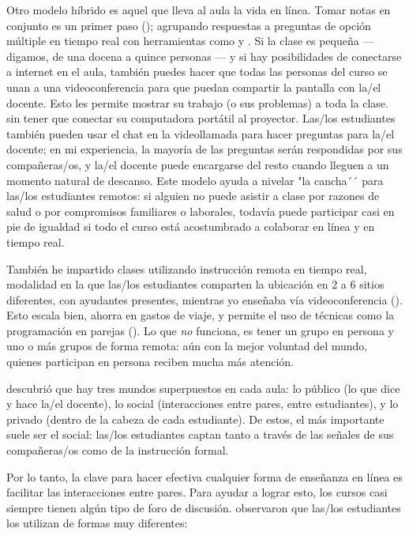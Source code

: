 Otro modelo híbrido es aquel que lleva al aula la vida en línea.
Tomar notas en conjunto es un primer paso ();
agrupando respuestas a preguntas de opción múltiple en tiempo real
con herramientas como 
y .
Si la clase es pequeña --- digamos, de una docena a quince personas ---
y si hay posibilidades de conectarse a internet en el aula,
también puedes
hacer que todas las personas del curso se unan a una videoconferencia
para que puedan compartir la pantalla con la/el docente.
Esto les permite mostrar su trabajo (o sus problemas) a toda la clase.
sin tener que conectar su computadora portátil al proyector.
Las/los estudiantes también pueden usar el chat en la videollamada para hacer preguntas para la/el docente;
en mi experiencia,
la mayoría de las preguntas serán respondidas por sus compañeras/os,
y la/el docente puede encargarse del resto cuando lleguen a un momento natural de descanso.
Este modelo ayuda a nivelar "la cancha´´ para las/los estudiantes remotos:
si alguien no puede asistir a clase por razones de salud
o por compromisos familiares o laborales,
todavía puede participar casi en pie de igualdad
si todo el curso está acostumbrado a colaborar en línea y en tiempo real.

También he impartido clases utilizando instrucción remota en tiempo real,
modalidad en la que las/los estudiantes comparten la ubicación en 2 a 6 sitios diferentes, con ayudantes presentes,
mientras yo enseñaba vía videoconferencia ().
Esto escala bien,
ahorra en gastos de viaje,
y permite el uso de técnicas como la programación en parejas ().
Lo que \emph{no} funciona, es tener un grupo en persona y uno o más grupos de forma remota:
aún con la mejor voluntad del mundo,
quienes participan en persona reciben mucha más atención.


\cite{Nuth2007} descubrió que hay tres mundos superpuestos en cada aula:
lo público (lo que dice y hace la/el docente),
lo social (interacciones entre pares, entre estudiantes),
y lo privado (dentro de la cabeza de cada estudiante).
De estos,
el más importante suele ser el social:
las/los estudiantes captan tanto a través de las señales de sus compañeras/os como de la instrucción formal.

Por lo tanto, la clave para hacer efectiva cualquier forma de enseñanza en línea es
facilitar las interacciones entre pares.
Para ayudar a lograr esto,
los cursos casi siempre tienen algún tipo de foro de discusión.
\cite{Mill2016a} observaron que las/los estudiantes los utilizan de formas muy diferentes:

